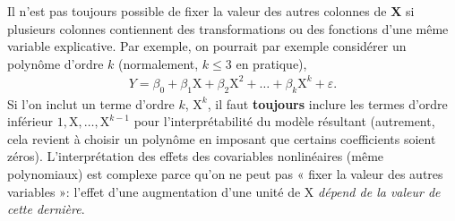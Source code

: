 \documentclass[
  11pt,
  letterpaper,
]{scrbook}
\theoremstyle{definition}
\theoremstyle{remark}
\begin{document}
Il n'est pas toujours possible de fixer la valeur des autres colonnes de
\(\mathbf{X}\) si plusieurs colonnes contiennent des transformations ou
des fonctions d'une même variable explicative. Par exemple, on pourrait
par exemple considérer un polynôme d'ordre \(k\) (normalement,
\(k\leq 3\) en pratique), \begin{align*}
Y=\beta_0+ \beta_1 \mathrm{X}+ \beta_2 \mathrm{X}^2 + \ldots +\beta_k \mathrm{X}^k + \varepsilon.
\end{align*} Si l'on inclut un terme d'ordre \(k\), \(\mathrm{X}^k\), il
faut \textbf{toujours} inclure les termes d'ordre inférieur
\(1, \mathrm{X}, \ldots, \mathrm{X}^{k-1}\) pour l'interprétabilité du
modèle résultant (autrement, cela revient à choisir un polynôme en
imposant que certains coefficients soient zéros). L'interprétation des
effets des covariables nonlinéaires (même polynomiaux) est complexe
parce qu'on ne peut pas « fixer la valeur des autres variables »:
l'effet d'une augmentation d'une unité de \(\mathrm{X}\) \emph{dépend de
la valeur de cette dernière}.
\end{document}
